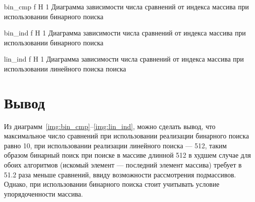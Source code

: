 {bin_cmp} %
{f} %
{H} %
{1\textwidth} %
{Диаграмма зависимости числа сравнений от индекса массива при использовании бинарного поиска} %

{bin_ind} %
{f} %
{H} %
{1\textwidth} %
{Диаграмма зависимости числа сравнений от индекса массива при использовании бинарного поиска} %

{lin_ind} %
{f} %
{H} %
{1\textwidth} %
{Диаграмма зависимости числа сравнений от индекса массива при использовании линейного поиска поиска} %




\section*{Вывод}
Из диаграмм~\ref{img:bin_cmp}--\ref{img:lin_ind}, можно сделать вывод, что максимальное число сравнений при использовании реализации бинарного поиска равно 10, при использовании реализации линейного поиска --- 512, таким образом бинарный поиск при поиске в массиве длинной 512 в худшем случае для обоих алгоритмов (искомый элемент --- последний элемент массива) требует в 51.2 раза меньше сравнений, ввиду возможности рассмотрения подмассивов. Однако, при использовании бинарного поиска стоит учитывать условие упорядоченности массива.


